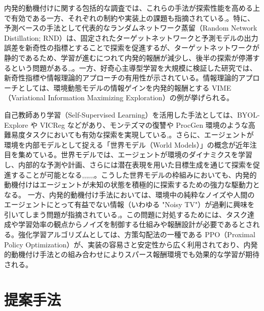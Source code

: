内発的動機付けに関する包括的な調査では、これらの手法が探索性能を高める上で有効である一方、それぞれの制約や実装上の課題も指摘されている\cite{IMRL},\cite{IMRL2}。特に、予測ベースの手法として代表的なランダムネットワーク蒸留（Random Network Distillation; RND）は、固定されたターゲットネットワークと予測モデルの出力誤差を新奇性の指標とすることで探索を促進するが、ターゲットネットワークが静的であるため、学習が進むにつれて内発的報酬が減少し、後半の探索が停滞するという問題がある\cite{RND},\cite{IMRL},\cite{IMRL2}。一方、好奇心主導型学習を大規模に検証した研究では、新奇性指標や情報理論的アプローチの有用性が示されている\cite{CSL}。情報理論的アプローチとしては、環境動態モデルの情報ゲインを内発的報酬とする VIME（Variational Information Maximizing Exploration）の例が挙げられる\cite{VIME}。

自己教師あり学習（Self-Supervised Learning）を活用した手法としては、BYOL-Explore や VICReg などがあり、モンテズマの復讐や ProcGen 環境のような高難易度タスクにおいても有効な探索を実現している\cite{BYOL},\cite{SEMRE}。さらに、エージェントが環境を内部モデルとして捉える「世界モデル（World Models）」の概念が近年注目を集めている\cite{WM}\cite{CB}。世界モデルでは、エージェントが環境のダイナミクスを学習し、内部的な予測や計画、さらには潜在表現を用いた目標生成を通じて探索を促進することが可能となる\cite{IMRL},\cite{IMRL2},\cite{LTP},\cite{WDM},\cite{AWMPC},\cite{LLD},\cite{DAG}。こうした世界モデルの枠組みにおいても、内発的動機付けはエージェントが未知の状態を積極的に探索するための強力な駆動力となる。
一方、内発的動機付け手法においては、環境中の純粋なノイズや人間のエージェントにとって有益でない情報（いわゆる "Noisy TV"）が過剰に興味を引いてしまう問題が指摘されている\cite{IM},\cite{CB}。この問題に対処するためには、タスク達成や学習効率の観点からノイズを制御する仕組みや報酬設計が必要であるとされる。強化学習アルゴリズムとしては、方策勾配法の一種である PPO（Proximal Policy Optimization）が、実装の容易さと安定性から広く利用されており、内発的動機付け手法との組み合わせによりスパース報酬環境でも効果的な学習が期待される\cite{PPO}。

\section{提案手法}
